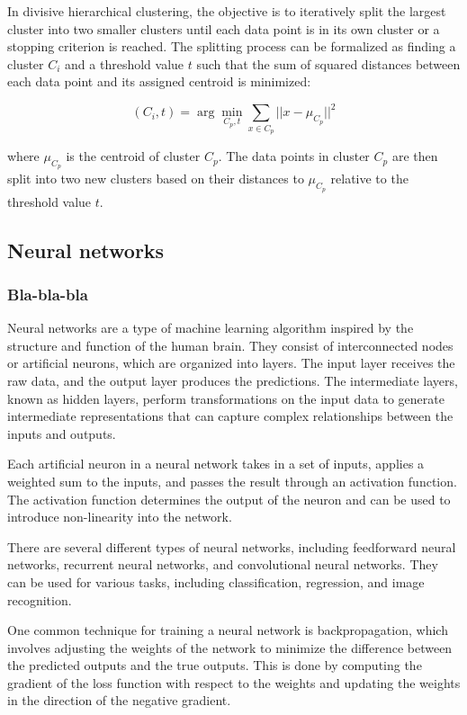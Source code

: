 \documentclass[12pt, a4paper, oneside]{article}
\begin{document}
In divisive hierarchical clustering, the objective is to iteratively split the largest cluster into two smaller clusters until each data point is in its own cluster or a stopping criterion is reached. The splitting process can be formalized as finding a cluster $C_i$ and a threshold value $t$ such that the sum of squared distances between each data point and its assigned centroid is minimized:

$$ (C_i, t) = \arg \min_{C_p, t} \sum_{x \in C_p} ||x - \mu_{C_p}||^2 $$

where $\mu_{C_p}$ is the centroid of cluster $C_p$. The data points in cluster $C_p$ are then split into two new clusters based on their distances to $\mu_{C_p}$ relative to the threshold value $t$.
\subsection{ Neural networks  }
\subsubsection{Bla-bla-bla } 
Neural networks are a type of machine learning algorithm inspired by the structure and function of the human brain. They consist of interconnected nodes or artificial neurons, which are organized into layers. The input layer receives the raw data, and the output layer produces the predictions. The intermediate layers, known as hidden layers, perform transformations on the input data to generate intermediate representations that can capture complex relationships between the inputs and outputs.

Each artificial neuron in a neural network takes in a set of inputs, applies a weighted sum to the inputs, and passes the result through an activation function. The activation function determines the output of the neuron and can be used to introduce non-linearity into the network.

There are several different types of neural networks, including feedforward neural networks, recurrent neural networks, and convolutional neural networks. They can be used for various tasks, including classification, regression, and image recognition.

One common technique for training a neural network is backpropagation, which involves adjusting the weights of the network to minimize the difference between the predicted outputs and the true outputs. This is done by computing the gradient of the loss function with respect to the weights and updating the weights in the direction of the negative gradient.
\end{document}
